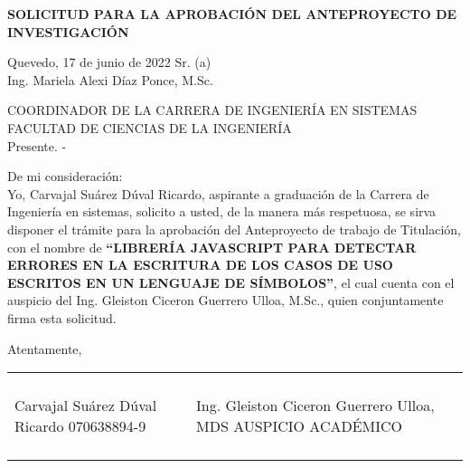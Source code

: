 \begin{center}
	\textbf{SOLICITUD PARA LA APROBACIÓN DEL ANTEPROYECTO DE INVESTIGACIÓN}
\end{center}


Quevedo, 17 de junio de 2022 Sr. (a) \\

Ing. Mariela Alexi Díaz Ponce, M.Sc.

COORDINADOR DE LA CARRERA DE INGENIERÍA EN SISTEMAS FACULTAD DE CIENCIAS DE LA INGENIERÍA \\

Presente. -

De mi consideración: \\

Yo, Carvajal Suárez Dúval Ricardo, aspirante a graduación de la Carrera de Ingeniería en sistemas, solicito a usted, de la manera más respetuosa, se sirva disponer el trámite para la aprobación del Anteproyecto de trabajo de Titulación, con el nombre de \textbf{“LIBRERÍA JAVASCRIPT PARA DETECTAR ERRORES EN LA ESCRITURA DE LOS CASOS DE USO ESCRITOS EN UN LENGUAJE DE SÍMBOLOS”}, el cual cuenta con el auspicio del Ing. Gleiston Ciceron Guerrero Ulloa, M.Sc., quien conjuntamente firma esta solicitud.

\begin{center}
	Atentamente,

	\begin{tabular}{@{}p{2.8in}p{3in}@{}}
		\vspace{3cm} \dotfill   
		& \vspace{3cm} \dotfill\\
		\vspace{-1cm}
		\begin{center}
			Carvajal Suárez Dúval Ricardo    
			070638894-9  
		\end{center}   
		& 
	    \vspace{-1cm}
		\begin{center}
			Ing. Gleiston Ciceron Guerrero Ulloa, MDS 
		AUSPICIO ACADÉMICO
		\end{center}  \\                 
		& \\[8ex]
	\end{tabular} 
	
\end{center}


